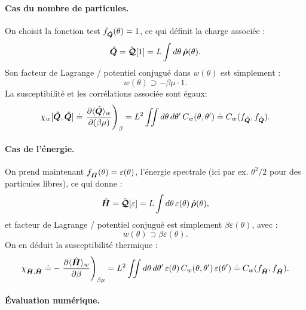 \paragraph{Cas du nombre de particules.}
On choisit la fonction test \( f_{\hat{\bm{Q}}}(\theta) = 1 \), ce qui définit la charge associée :
\[
\hat{\bm{Q}} = \hat{\bm{\mathcal{Q}}}[1] = L \int d\theta\, \hat{\bm{\rho}}(\theta).
\]
Son facteur de Lagrange / potentiel conjugué dans \( w(\theta) \) est simplement :
\[
w(\theta) \supset -\beta \mu \cdot 1.
\]
La susceptibilité  et les corrélations associée sont égaux:
\[
\chi_w[{\hat{\bm{Q}},\hat{\bm{Q}}}] \doteq \left . \frac{\partial \langle \hat{\bm{Q}} \rangle_w}{\partial (\beta \mu)} \right)_\beta  = L^2 \iint d\theta\, d\theta'\, C_w(\theta, \theta') \doteq C_w(f_{\hat{\bm{Q}}}, f_{\hat{\bm{Q}}}).
\]

\paragraph{Cas de l’énergie.}
On prend maintenant \( f_{\hat{\bm{H}}}(\theta) = \varepsilon(\theta) \), l’énergie spectrale (ici par ex. \( \theta^2/2 \) pour des particules libres), ce qui donne :
\[
\hat{\bm{H}} = \hat{\bm{\mathcal{Q}}}[\varepsilon] = L \int d\theta\, \varepsilon(\theta)\, \hat{\bm{\rho}}(\theta),
\]
et facteur de Lagrange / potentiel conjugué  est simplement \( \beta \varepsilon(\theta) \), avec :
\[
w(\theta) \supset \beta \varepsilon(\theta).
\]
On en déduit la susceptibilité thermique :
\[
\chi_{\hat{\bm{H}},\hat{\bm{H}}} \doteq -\left.\frac{\partial \langle \hat{\bm{H}} \rangle_w}{\partial \beta} \right)_{\beta \mu}  = L^2 \iint d\theta\, d\theta'\, \varepsilon(\theta)\, C_w(\theta, \theta')\, \varepsilon(\theta') \doteq C_w(f_{\hat{\bm{H}}}, f_{\hat{\bm{H}}}).
\]

\paragraph{Évaluation numérique.}



